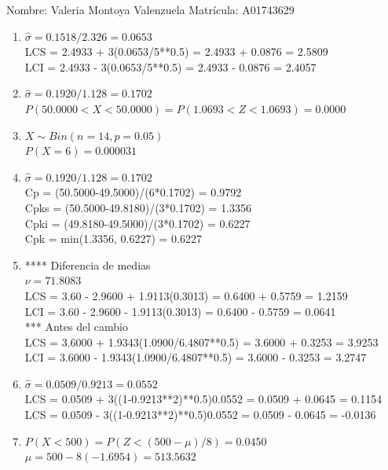 \documentclass[8pt]{report}
\begin{document}
 \newpage

Nombre: \underline{\hspace*{.2in}}
Valeria Montoya Valenzuela
\underline{\hspace*{.2in}} \quad Matr\'icula:\underline{\hspace*{.2in}}
A01743629
\underline{\hspace*{.2in}} \\

\begin{enumerate}
\item $\hat\sigma = 0.1518/2.326 = 0.0653$\\
LCS = 2.4933 + 3(0.0653/5**0.5) = 2.4933 + 0.0876 = 2.5809\\
LCI = 2.4933 - 3(0.0653/5**0.5) = 2.4933 - 0.0876 = 2.4057
\item $\hat\sigma = 0.1920/1.128 = 0.1702$\\
$P(50.0000 < X < 50.0000) = P(1.0693 < Z < 1.0693) = 0.0000$\\
\item $X \sim Bin(n=14, p=0.05)$\\
$P(X = 6) = 0.000031$
\item $\hat\sigma = 0.1920/1.128 = 0.1702$\\
Cp = (50.5000-49.5000)/(6*0.1702) = 0.9792\\
Cpks = (50.5000-49.8180)/(3*0.1702) = 1.3356\\
Cpki = (49.8180-49.5000)/(3*0.1702) = 0.6227\\
Cpk = min(1.3356, 0.6227) = 0.6227
\item **** Diferencia de medias\\
$\nu = 71.8083$\\
LCS = 3.60 - 2.9600 + 1.9113(0.3013) = 0.6400 + 0.5759 = 1.2159\\
LCI = 3.60 - 2.9600 - 1.9113(0.3013) = 0.6400 - 0.5759 = 0.0641\\
*** Antes del cambio\\
LCS = 3.6000 + 1.9343(1.0900/6.4807**0.5) = 3.6000 + 0.3253 = 3.9253\\
LCI = 3.6000 - 1.9343(1.0900/6.4807**0.5) = 3.6000 - 0.3253 = 3.2747\\
\item $\hat\sigma = 0.0509/0.9213 = 0.0552$\\
LCS = 0.0509 + 3((1-0.9213**2)**0.5)0.0552 = 0.0509 + 0.0645 = 0.1154\\
LCS = 0.0509 - 3((1-0.9213**2)**0.5)0.0552 = 0.0509 - 0.0645 = -0.0136
\item $P(X < 500) = P(Z < (500-\mu)/8) = 0.0450$\\
$\mu = 500 - 8(-1.6954) = 513.5632$\\
\end{enumerate}
\end{document}
